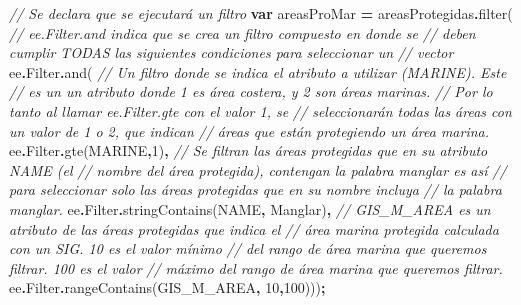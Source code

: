 \documentclass[
  12pt,
  letterpaper,
  twoside]{book}
\newenvironment{Shaded}{\begin{snugshade}}{\end{snugshade}}
\newcommand{\AttributeTok}[1]{\textcolor[rgb]{0.77,0.63,0.00}{#1}}
\newcommand{\CommentTok}[1]{\textcolor[rgb]{0.56,0.35,0.01}{\textit{#1}}}
\newcommand{\DecValTok}[1]{\textcolor[rgb]{0.00,0.00,0.81}{#1}}
\newcommand{\FunctionTok}[1]{\textcolor[rgb]{0.00,0.00,0.00}{#1}}
\newcommand{\KeywordTok}[1]{\textcolor[rgb]{0.13,0.29,0.53}{\textbf{#1}}}
\newcommand{\NormalTok}[1]{#1}
\newcommand{\OperatorTok}[1]{\textcolor[rgb]{0.81,0.36,0.00}{\textbf{#1}}}
\newcommand{\StringTok}[1]{\textcolor[rgb]{0.31,0.60,0.02}{#1}}
\begin{document}
\begin{Shaded}
\begin{Highlighting}[]
\CommentTok{// Se declara que se ejecutará un filtro}
\KeywordTok{var}\NormalTok{ areasProMar }\OperatorTok{=}\NormalTok{ areasProtegidas}\OperatorTok{.}\FunctionTok{filter}\NormalTok{( }
  \CommentTok{// ee.Filter.and indica que se crea un filtro compuesto en donde se }
  \CommentTok{// deben cumplir TODAS las siguientes condiciones para seleccionar un }
  \CommentTok{// vector}
\NormalTok{  ee}\OperatorTok{.}\AttributeTok{Filter}\OperatorTok{.}\FunctionTok{and}\NormalTok{(    }
  \CommentTok{//  Un filtro donde se indica el atributo a utilizar (\textquotesingle{}MARINE\textquotesingle{}). Este }
  \CommentTok{// es un un atributo donde 1 es área costera, y 2 son áreas marinas.}
  \CommentTok{//  Por lo tanto al llamar \textasciigrave{}ee.Filter.gte\textasciigrave{} con el valor 1, se }
  \CommentTok{// seleccionarán todas las áreas con un valor de 1 o 2, que indican}
  \CommentTok{// áreas que están protegiendo un área marina.}
\NormalTok{  ee}\OperatorTok{.}\AttributeTok{Filter}\OperatorTok{.}\FunctionTok{gte}\NormalTok{(}\StringTok{\textquotesingle{}MARINE\textquotesingle{}}\OperatorTok{,}\DecValTok{1}\NormalTok{)}\OperatorTok{,}   
  \CommentTok{//  Se filtran las áreas protegidas que en su atributo \textquotesingle{}NAME\textquotesingle{} (el }
  \CommentTok{// nombre del área protegida), contengan la  palabra manglar es así}
  \CommentTok{// para seleccionar solo las áreas protegidas que en su nombre incluya }
  \CommentTok{// la palabra manglar.}
\NormalTok{  ee}\OperatorTok{.}\AttributeTok{Filter}\OperatorTok{.}\FunctionTok{stringContains}\NormalTok{(}\StringTok{\textquotesingle{}NAME\textquotesingle{}}\OperatorTok{,} \StringTok{\textquotesingle{}Manglar\textquotesingle{}}\NormalTok{)}\OperatorTok{,}
  \CommentTok{//  \textquotesingle{}GIS\_M\_AREA\textquotesingle{} es un atributo de las áreas protegidas que indica el }
  \CommentTok{// área marina protegida calculada con un SIG.    10 es el valor mínimo }
  \CommentTok{// del rango de área marina que queremos filtrar. 100 es el valor }
  \CommentTok{// máximo del rango de área marina que queremos filtrar.}
\NormalTok{  ee}\OperatorTok{.}\AttributeTok{Filter}\OperatorTok{.}\FunctionTok{rangeContains}\NormalTok{(}\StringTok{\textquotesingle{}GIS\_M\_AREA\textquotesingle{}}\OperatorTok{,} \DecValTok{10}\OperatorTok{,}\DecValTok{100}\NormalTok{)))}\OperatorTok{;} 
\end{Highlighting}
\end{Shaded}
\end{document}
